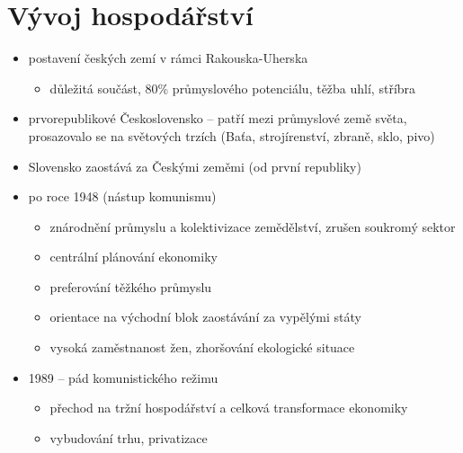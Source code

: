 \section{Vývoj hospodářství}
\begin{itemize}
\item postavení českých zemí v rámci Rakouska-Uherska
	\begin{itemize}
	\item důležitá součást, 80\% průmyslového potenciálu, těžba uhlí, stříbra
	\end{itemize}
\item prvorepublikové Československo -- patří mezi průmyslové země světa, prosazovalo se na světových trzích (Baťa, strojírenství, zbraně, sklo, pivo)
\item Slovensko zaostává za Českými zeměmi (od první republiky)
\item po roce 1948 (nástup komunismu)
	\begin{itemize}
	\item znárodnění průmyslu a kolektivizace zemědělství, zrušen soukromý sektor
	\item centrální plánování ekonomiky
	\item preferování těžkého průmyslu
	\item orientace na východní blok \ra zaostávání za vypělými státy
	\item vysoká zaměstnanost žen, zhoršování ekologické situace
	\end{itemize}
\item 1989 -- pád komunistického režimu
	\begin{itemize}
	\item přechod na tržní hospodářství a celková transformace ekonomiky
	\item vybudování trhu, privatizace
	\end{itemize}



\end{itemize}
